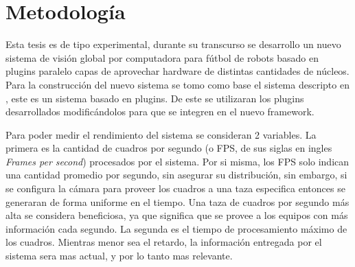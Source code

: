 
\section{Metodología}

Esta tesis es de tipo experimental, durante su transcurso se desarrollo un
nuevo sistema de visión global por computadora para fútbol de robots basado en
plugins paralelo capas de aprovechar hardware de distintas cantidades de
núcleos. Para la construcción del nuevo sistema se tomo como base el sistema
descripto en \cite{torres2014}, este es un sistema basado en plugins. De este
se utilizaran los plugins desarrollados modificándolos para que se integren en
el nuevo framework.

Para poder medir el rendimiento del sistema se consideran 2 variables. La
primera es la cantidad de cuadros por segundo (o FPS, de sus siglas en ingles
\emph{Frames per second}) procesados por el sistema. Por si misma, los FPS solo
indican una cantidad promedio por segundo, sin asegurar su distribución, sin
embargo, si se configura la cámara para proveer los cuadros a una taza
especifica entonces se generaran de forma uniforme en el tiempo. Una taza de
cuadros por segundo más alta se considera beneficiosa, ya que significa que se
provee a los equipos con más información cada segundo. La segunda es el tiempo
de procesamiento máximo de los cuadros. Mientras menor sea el retardo, la
información entregada por el sistema sera mas actual, y por lo tanto mas
relevante.

